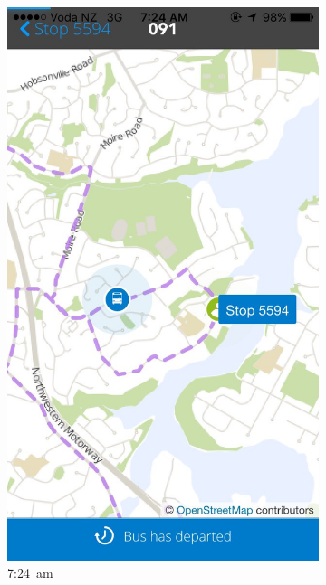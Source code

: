 \documentclass[12pt,a4paper]{article}
\begin{document}
\begin{figure}[bt]
  \centering
  \begin{subfigure}{0.35\textwidth}
    \includegraphics[width=\textwidth,trim={0 0 0 15cm},clip]{bus-loop-durp1.jpg}
    \caption{7:24~am}
    \label{fig:colwill-loop-1}
  \end{subfigure}
  ~
  \begin{subfigure}{0.35\textwidth}

\end{subfigure}
\end{figure}
\end{document}
